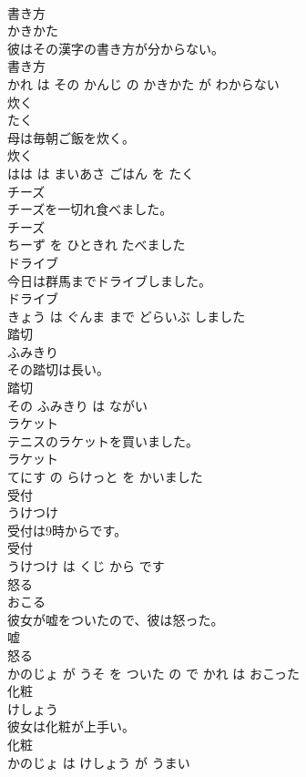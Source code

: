 \documentclass[8pt]{extreport}
\begin{document}
\begin{CJK}{UTF8}{min}
\\	書き方	
\\	かきかた			
\\	彼はその漢字の書き方が分からない。	
\\	書き方 
\\	かれ は その かんじ の かきかた が わからない			
\\	炊く	
\\	たく			
\\	母は毎朝ご飯を炊く。	
\\	炊く 
\\	はは は まいあさ ごはん を たく			
\\	チーズ	
\\	チーズを一切れ食べました。	
\\	チーズ 
\\	ちーず を ひときれ たべました			
\\	ドライブ	
\\	今日は群馬までドライブしました。	
\\	ドライブ 
\\	きょう は ぐんま まで どらいぶ しました			
\\	踏切	
\\	ふみきり			
\\	その踏切は長い。	
\\	踏切 
\\	その ふみきり は ながい			
\\	ラケット	
\\	テニスのラケットを買いました。	
\\	ラケット 
\\	てにす の らけっと を かいました			
\\	受付	
\\	うけつけ			
\\	受付は9時からです。	
\\	受付 
\\	うけつけ は くじ から です			
\\	怒る	
\\	おこる			
\\	彼女が嘘をついたので、彼は怒った。	
\\	嘘 
\\	怒る 
\\	かのじょ が うそ を ついた の で かれ は おこった			
\\	化粧	
\\	けしょう			
\\	彼女は化粧が上手い。	
\\	化粧 
\\	かのじょ は けしょう が うまい			

\end{CJK}
\end{document}
